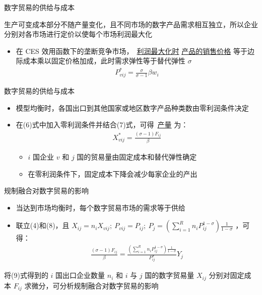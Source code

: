 \documentclass{beamer}
\begin{document}
\begin{frame}{数字贸易的供给与成本}
    \begin{tcolorbox}[colback=lightyellow,colframe=deepblue,coltext=black]
        生产可变成本部分不随产量变化，且不同市场的数字产品需求相互独立，所以企业分别对各市场进行定价以使每个市场利润最大化
    \end{tcolorbox}
    \begin{itemize}
        \item 在 CES 效用函数下的垄断竞争市场，\ \underline{利润最大化时} \underline{产品的销售价格} 等于边际成本乘以固定价格加成，此时需求弹性等于替代弹性 $\sigma$
        \begin{align}
            P_{vij}^{*} = \frac{\sigma}{\sigma - 1} \beta w_i \tag{7}
        \end{align}
    \end{itemize}
\end{frame}

\begin{frame}{数字贸易的供给与成本}
    \begin{itemize}
        \item 模型均衡时，各国出口到其他国家或地区数字产品种类数由零利润条件决定
        \item 在(6)式中加入零利润条件并结合(7)式，可得\ \underline{产量} 为：
        \begin{align}
            X_{vij}^{*} = \frac{(\sigma - 1) F_{ij}}{\beta} \tag{8}
        \end{align}
        \begin{itemize}
            \item $i$ 国企业 $v$ 和 $j$ 国的贸易量由固定成本和替代弹性确定
            \item 在零利润条件下，固定成本下降会减少每家企业的产出
        \end{itemize}
    \end{itemize}
\end{frame}

\begin{frame}{规制融合对数字贸易的影响}
    \begin{itemize}
        \item 当达到市场均衡时，每个数字贸易市场的需求等于供给
        \item 联立(4)和(8)，且 $X_{ij}=n_i X_{vij};\ P_{vij}=P_{ij};\ P_{j}=(\sum_{i=1}^R n_iP_{ij}^{1-\sigma}){\frac{1}{1-\sigma}}$ ，可得：
        \begin{align}
            \frac{(\sigma - 1)F_{ij}}{\beta} = \frac{(\sum_{i=1}^R n_iP_{ij}^{1-\sigma}){\frac{1}{1-\sigma}}}{P_{ij}^{\sigma}} Y_j \tag{9}
        \end{align}
    \end{itemize}
    \begin{tcolorbox}[colback=lightyellow,colframe=deepblue,coltext=black]
        将(9)式得到的 $i$ 国出口企业数量 $n_i$ 和 $i$ 与 $j$ 国的数字贸易量 $X_{ij}$ 分别对固定成本 $F_{ij}$ 求微分，可分析规制融合对数字贸易的影响
    \end{tcolorbox}
\end{frame}
\end{document}
